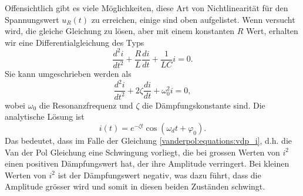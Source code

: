 \noindent Offensichtlich gibt es viele Möglichkeiten, diese Art von Nichtlinearität für den Spannungswert $u_R(t)$ zu erreichen, einige sind oben aufgelistet.
Wenn versucht wird, die gleiche Gleichung zu lösen, aber mit einem konstanten $R$ Wert, erhalten wir eine Differentialgleichung des Typs
\begin{equation}
\frac{d^{2}i}{d t^{2}}+\frac{R}{L} \frac{d i}{d t}+\frac{1}{LC}i = 0.
\end{equation}
Sie kann umgeschrieben werden als
\begin{equation}
\frac{d^{2}i}{d t^{2}}+ 2\zeta \frac{d i}{d t}+\omega_0^{2}i = 0,
\end{equation}
wobei $\omega_0$ die Resonanzfrequenz und $\zeta$ die Dämpfungskonstante sind. Die analytische Lösung ist
%
%
\begin{equation}
i(t) = e^{-\zeta t} \cos(\omega_dt+\varphi_0).
\end{equation}
Das bedeutet, dass im Falle der Gleichung \eqref{vanderpol:equations:vdp_i}, d.h. die Van der Pol Gleichung eine Schwingung vorliegt, die bei grossen Werten von $i^2$ einen positiven Dämpfungswert hat, der ihre Amplitude verringert. Bei kleinen Werten von $i^2$ ist der Dämpfungswert negativ, was dazu führt, dass die Amplitude grösser wird und somit in diesen beiden Zuständen schwingt.

